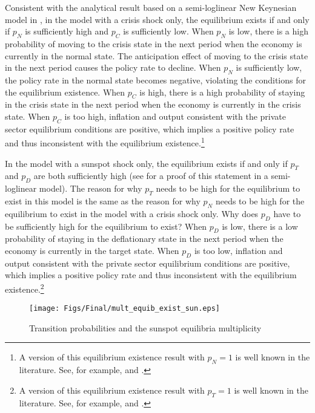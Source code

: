 \documentclass[11pt]{article}
\begin{document}
\begin{singlespace}
		Consistent with the analytical result based on a semi-loglinear New Keynesian model in \citet{NakataSchmidtForthcomingJME}, in the model with a crisis shock only, the equilibrium exists if and only if $p_{N}$ is sufficiently high and $p_{C}$ is sufficiently low. When $p_{N}$ is low, there is a high probability of moving to the crisis state in the next period when the economy is currently in the normal state. The anticipation effect of moving to the crisis state in the next period causes the policy rate to decline. When $p_{N}$ is sufficiently low, the policy rate in the normal state becomes negative, violating the conditions for the equilibrium existence. When $p_{C}$ is high, there is a high probability of staying in the crisis state in the next period when the economy is currently in the crisis state. When $p_{C}$ is too high, inflation and output consistent with the private sector equilibrium conditions are positive, which implies a positive policy rate and thus inconsistent with the equilibrium existence.\footnote{A version of this equilibrium existence result with $p_{N}=1$ is well known in the literature. See, for example, \citet{Eggertsson2011} and \citet{BonevaBraunWaki2016}.}

		In the model with a sunspot shock only, the equilibrium exists if and only if $p_{T}$ and $p_{D}$ are both sufficiently high (see \citet{NakataSchmidt2019} for a proof of this statement in a semi-loglinear model). The reason for why $p_{T}$ needs to be high for the equilibrium to exist in this model is the same as the reason for why $p_{N}$ needs to be high for the equilibrium to exist in the model with a crisis shock only. Why does $p_{D}$ have to be sufficiently high for the equilibrium to exist? When $p_{D}$ is low, there is a low probability of staying in the deflationary state in the next period when the economy is currently in the target state. When $p_{D}$ is too low, inflation and output consistent with the private sector equilibrium conditions are positive, which implies a positive policy rate and thus inconsistent with the equilibrium existence.\footnote{A version of this equilibrium existence result with $p_{T}=1$ is well known in the literature. See, for example, \citet{MertensRavn2014} and \citet{BonevaBraunWaki2016}.}

	    \begin{figure}[!ht]
			\begin{center}
				\caption{Transition probabilities and the sunspot equilibria multiplicity\label{fig:ExistenceMultiplicity}}
	        	\vspace{-1em}
	        	\texttt{[image: Figs/Final/mult\_equib\_exist\_sun.eps]}\\
			\end{center}
	        \vspace{-1em}
		\end{figure}


\end{singlespace}
\end{document}
